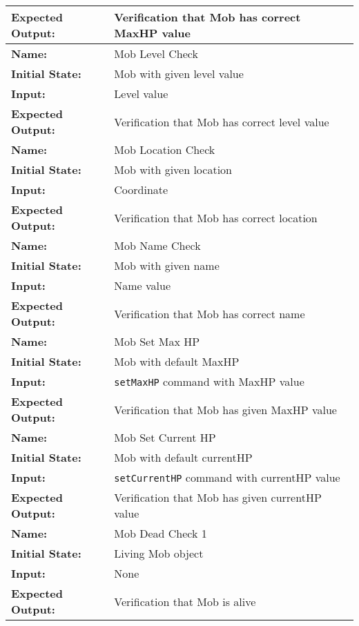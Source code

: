 \documentclass[12pt, titlepage]{article}
\begin{document}
\begin{center}
\begin{longtable}{ l | p{10cm} }
				\textbf{Expected Output:} & Verification that Mob has correct MaxHP value\\[0.6em]
				\hline
				\rule{0pt}{1.5em}\textbf{Name:} & Mob Level Check\\
				\textbf{Initial State:} & Mob with given level value\\
				\textbf{Input:} & Level value\\
				\textbf{Expected Output:} & Verification that Mob has correct level value\\[0.6em]
				\hline
				\rule{0pt}{1.5em}\textbf{Name:} & Mob Location Check\\
				\textbf{Initial State:} & Mob with given location\\
				\textbf{Input:} & Coordinate\\
				\textbf{Expected Output:} & Verification that Mob has correct location\\[0.6em]
				\hline
				\rule{0pt}{1.5em}\textbf{Name:} & Mob Name Check\\
				\textbf{Initial State:} & Mob with given name\\
				\textbf{Input:} & Name value\\
				\textbf{Expected Output:} & Verification that Mob has correct name\\[0.6em]
				\hline
				\rule{0pt}{1.5em}\textbf{Name:} & Mob Set Max HP\\
				\textbf{Initial State:} & Mob with default MaxHP\\
				\textbf{Input:} & \lstinline$setMaxHP$ command with MaxHP value\\
				\textbf{Expected Output:} & Verification that Mob has given MaxHP value\\[0.6em]
				\hline
				\rule{0pt}{1.5em}\textbf{Name:} & Mob Set Current HP\\
				\textbf{Initial State:} & Mob with default currentHP\\
				\textbf{Input:} & \lstinline$setCurrentHP$ command with currentHP value\\
				\textbf{Expected Output:} & Verification that Mob has given currentHP value\\[0.6em]
				\hline
				\rule{0pt}{1.5em}\textbf{Name:} & Mob Dead Check 1\\
				\textbf{Initial State:} & Living Mob object\\
				\textbf{Input:} & None\\
				\textbf{Expected Output:} & Verification that Mob is alive\\[0.6em]

\end{longtable}
\end{center}
\end{document}
